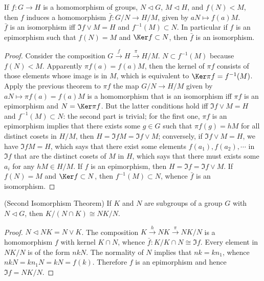 \begin{Corollary}
	If $ f:G \to H $ is a homomorphism of groups, $ N \vartriangleleft G $, $ M \vartriangleleft H $, and $ f(N)<M $, then $ f $ induces a homomorphism $ \bar{f}:G/N \to H/M $, given by $ aN \mapsto f(a)M $.\\
	$ \bar{f} $ is an isomorphism iff $ \Im f \vee M = H$ and $ f^{-1}(M)\subset N $. In particular if $ f $ is an epimorphism such that $ f(N)=M $ and $ \Ker f \subset N $, then $ \bar{f} $ is an isomorphism.
\end{Corollary}
\begin{proof}
	Consider the composition $ G \overset{f}{\to} H \overset{\pi}{\to}H/M$. $ N \subset f^{-1}(M) $ because $ f(N)<M $. Apparently $ \pi f(a) = f(a)M $, then the kernel of $ \pi f $ consists of those elements whose image is in $ M $, which is equivalent to $ \Ker \pi f = f^{-1}(M) $. Apply the previous theorem to $ \pi f $ the map $ G/N \to H/M $ given by $ aN \mapsto \pi f(a)=f(a)M $ is a homomorphism that is an isomorphism iff $ \pi f $ is an epimorphism and $ N = \Ker \pi f $. But the latter conditions hold iff $ \Im f \vee M = H $ and $ f^{-1}(M)\subset N $: the second part is trivial; for the first one, $ \pi f $ is an epimorphism implies that there exists some $ g \in G $ such that $ \pi f(g)=hM $ for all distinct cosets in $ H/M $, then $ H = \Im f M = \Im f \vee M $; conversely, if $ \Im f \vee M = H $, we have $ \Im f M =H $, which says that there exist some elements $ f(a_1),f(a_2),\cdots $ in $ \Im f $ that are the distinct cosets of $ M $ in $ H $, which says that there must exists some $ a_i $ for any $ hM \in H/M $. If $ f $ is an epimorphism, then $ H = \Im f = \Im f \vee M $. If $ f(N )=M $ and $ \Ker f \subset N $, then $ f^{-1}(M)\subset N $, whence $ \bar{f} $ is an isomorphism.
\end{proof}
\begin{Corollary}(Second Isomorphism Theorem)
	If $ K $ and $ N $ are subgroups of a group $ G $ with $ N \vartriangleleft G $, then $ K/(N \cap K)\cong NK/N $.
\end{Corollary}
\begin{proof}
	$ N \vartriangleleft NK = N \vee K $. The composition $ K \overset{h}{\to}NK \overset{\pi}{\to} NK/N $ is a homomorphism $ f $ with kernel $ K \cap N $, whence $ \bar{f}:K/K\cap N \cong \Im f $. Every element in $ NK/N $ is of the form $ nkN $. The normality of $ N $ implies that $ nk=kn_1 $, whence $ nkN = kn_1N=kN=f(k) $. Therefore $ f $ is an epimorphism and hence $ \Im f = NK/N $.
\end{proof}
